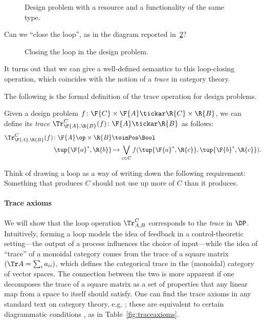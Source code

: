 \begin{figure}[h!]
\begin{center}
\end{center}
\caption{Design problem with a resource and a functionality of the same type. \label{fig:extrace_1}}
\end{figure}

Can we ``close the loop'', as in the diagram reported in~\cref{fig:extrace_2}?
\begin{figure}[h!]
\begin{center}
\end{center}
\caption{Closing the loop in the design problem. \label{fig:extrace_2}}
\end{figure}

It turns out that we can give a well-defined semantics to this loop-closing operation, which coincides with the notion of a \emph{trace} in category theory.

The following is the formal definition of the trace operation for design problems.

\begin{definition}
\label{def:dp-trace}
Given a design problem $f\colon \F{C} \times \F{A} \tickar \R{C} \times \R{B}$, we can define
its \emph{trace} $\Tr_{\F{A},\R{B}}^C(f) \colon \F{A} \tickar \R{B}$ as follows:
%
\begin{equation}
\label{eq:tracedef}
\begin{aligned}
	\Tr_{\F{A},\R{B}}^C(f) \colon  \F{A}\op \times \R{B} &\toinPos \Bool \\
	\tup{\F{a}^*, \R{b}} &\mapsto \bigvee_{c\in C}
		f(\tup{\F{a}^*, \R{c}},
			\tup{\F{b}^*, \R{c}}).
\end{aligned}
\end{equation}
\end{definition}


Think of drawing a loop as a way of writing down the following requirement: Something that produces $C$ should not use up more of $C$ than it produces.


\paragraph{Trace axioms}
We will show that the loop operation $\Tr_{A,B}^C$ corresponds to the \emph{trace} in $\DP$. Intuitively, forming a loop models the idea of feedback in a control-theoretic setting---the output of a process influences the choice of input---while the idea of ``trace'' of a monoidal category comes from the trace of a square matrix $(\Tr A = \sum_i a_{ii})$, which defines the categorical trace in the (monoidal) category of vector spaces. The connection between the two is more apparent if one decomposes the trace of a square matrix as a set of properties that any linear map from a space to itself should satisfy. One can find the trace axioms in any standard text on category theory, e.g. \cite{maclane}; these are equivalent to certain diagrammatic conditions \cite{joyal96}, as in Table~\ref{fig:traceaxioms}.

